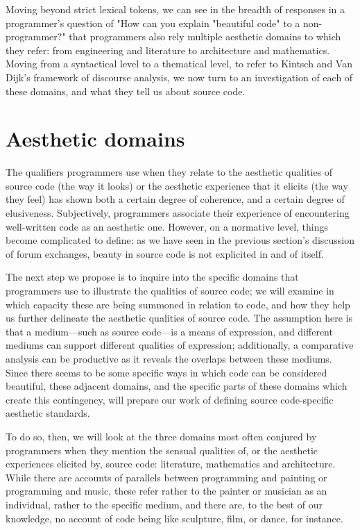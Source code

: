 Moving beyond strict lexical tokens, we can see in the breadth of responses in a programmer's question of "How can you explain "beautiful code" to a non-programmer?" \citep{stackoverflow_how_2013} that programmers also rely multiple aesthetic domains to which they refer: from engineering and literature to architecture and mathematics. Moving from a syntactical level to a thematical level, to refer to Kintsch and Van Dijk's framework of discourse analysis, we now turn to an investigation of each of these domains, and what they tell us about source code.

\section{Aesthetic domains}
\label{sec:aesthetic-domains}

The qualifiers programmers use when they relate to the aesthetic qualities of source code (the way it looks) or the aesthetic experience that it elicits (the way they feel) has shown both a certain degree of coherence, and a certain degree of elusiveness. Subjectively, programmers associate their experience of encountering well-written code as an aesthetic one. However, on a normative level, things become complicated to define: as we have seen in the previous section's discussion of forum exchanges, beauty in source code is not explicited in and of itself.

The next step we propose is to inquire into the specific domains that programmers use to illustrate the qualities of source code; we will examine in which capacity these are being summoned in relation to code, and how they help us further delineate the aesthetic qualities of source code. The assumption here is that a medium—such as source code—is a means of expression, and different mediums can support different qualities of expression; additionally, a comparative analysis can be productive as it reveals the overlaps between these mediums. Since there seems to be some specific ways in which code can be considered beautiful, these adjacent domains, and the specific parts of these domains which create this contingency, will prepare our work of defining source code-specific aesthetic standards.

To do so, then, we will look at the three domains most often conjured by programmers when they mention the sensual qualities of, or the aesthetic experiences elicited by, source code: literature, mathematics and architecture. While there are accounts of parallels between programming and painting \citep{graham_hackers_2003} or programming and music\citep{mclean_hacking_2004}, these refer rather to the painter or musician as an individual, rather to the specific medium, and there are, to the best of our knowledge, no account of code being like sculpture, film, or dance, for instance.

